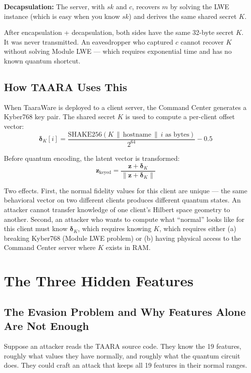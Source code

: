 \documentclass[11pt,a4paper]{article}
\newcommand{\norm}[1]{\left\lVert#1\right\rVert}
\begin{document}
\textbf{Decapsulation:} The server, with $sk$ and $c$, recovers $m$ by solving the LWE instance (which is easy when you know $sk$) and derives the same shared secret $K$.

After encapsulation + decapsulation, both sides have the same 32-byte secret $K$. It was never transmitted. An eavesdropper who captured $c$ cannot recover $K$ without solving Module LWE — which requires exponential time and has no known quantum shortcut.

\subsection{How TAARA Uses This}

When TaaraWare is deployed to a client server, the Command Center generates a Kyber768 key pair. The shared secret $K$ is used to compute a per-client offset vector:
\[
\boldsymbol{\delta}_K[i] = \frac{\text{SHAKE256}(K \,\|\, \text{hostname} \,\|\, i \text{ as bytes})}{2^{64}} - 0.5
\]

Before quantum encoding, the latent vector is transformed:
\[
\mathbf{z}_{\text{keyed}} = \frac{\mathbf{z} + \boldsymbol{\delta}_K}{\norm{\mathbf{z} + \boldsymbol{\delta}_K}}
\]

Two effects. First, the normal fidelity values for this client are unique — the same behavioral vector on two different clients produces different quantum states. An attacker cannot transfer knowledge of one client's Hilbert space geometry to another. Second, an attacker who wants to compute what ``normal'' looks like for this client must know $\boldsymbol{\delta}_K$, which requires knowing $K$, which requires either (a) breaking Kyber768 (Module LWE problem) or (b) having physical access to the Command Center server where $K$ exists in RAM.

\section{The Three Hidden Features}

\subsection{The Evasion Problem and Why Features Alone Are Not Enough}

Suppose an attacker reads the TAARA source code. They know the 19 features, roughly what values they have normally, and roughly what the quantum circuit does. They could craft an attack that keeps all 19 features in their normal ranges.
\end{document}
